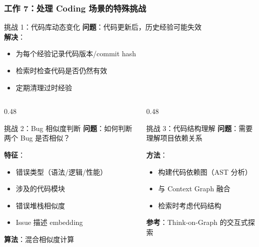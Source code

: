\documentclass[aspectratio=169,10pt]{beamer}
\begin{document}
\begin{frame}
  \frametitle{工作 7：处理 Coding 场景的特殊挑战}

  \begin{block}{挑战 1：代码库动态变化}
    \small
    \textbf{问题}：代码更新后，历史经验可能失效\\
    \textbf{解决}：
    \begin{itemize}
      \item 为每个经验记录代码版本/commit hash
      \item 检索时检查代码是否仍然有效
      \item 定期清理过时经验
    \end{itemize}
  \end{block}

  \begin{columns}[T]
    \begin{column}{0.48\textwidth}
      \begin{block}{挑战 2：Bug 相似度判断}
        \footnotesize
        \textbf{问题}：如何判断两个 Bug 是否相似？

        \vspace{0.1cm}

        \textbf{特征}：
        \begin{itemize}
          \item 错误类型（语法/逻辑/性能）
          \item 涉及的代码模块
          \item 错误堆栈相似度
          \item Issue 描述 embedding
        \end{itemize}

        \vspace{0.1cm}

        \textbf{算法}：混合相似度计算
      \end{block}
    \end{column}

    \begin{column}{0.48\textwidth}
      \begin{block}{挑战 3：代码结构理解}
        \footnotesize
        \textbf{问题}：需要理解项目依赖关系

        \vspace{0.1cm}

        \textbf{方法}：
        \begin{itemize}
          \item 构建代码依赖图（AST 分析）
          \item 与 Context Graph 融合
          \item 检索时考虑代码结构
        \end{itemize}

        \vspace{0.1cm}

        \textbf{参考}：Think-on-Graph 的交互式探索
      \end{block}
    \end{column}
  \end{columns}
\end{frame}
\end{document}
